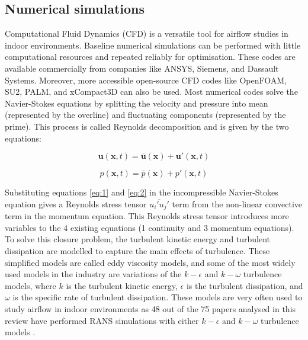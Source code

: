 \documentclass[preprint,12pt]{elsarticle}
\begin{document}
\subsection{Numerical simulations}

Computational Fluid Dynamics (CFD) is a versatile tool for airflow studies in indoor environments. Baseline numerical simulations can be performed with little computational resources and repeated reliably for optimisation. These codes are available commercially from companies like ANSYS, Siemens, and Dassault Systems. Moreover, more accessible open-source CFD codes like OpenFOAM, SU2, PALM, and xCompact3D can also be used. Most numerical codes solve the Navier-Stokes equations by splitting the velocity and pressure into mean (represented by the overline) and fluctuating components (represented by the prime). This process is called Reynolds decomposition and is given by the two equations:

\begin{equation}
    \textbf{u}(\textbf{x},t) = \bar{\textbf{u}}(\textbf{x}) + \textbf{u}'(\textbf{x},t)
\label{eq:1}
\end{equation}

\begin{equation}
    p(\textbf{x},t) = \bar{p}(\textbf{x}) + p'(\textbf{x},t)
\label{eq:2}
\end{equation}

Substituting equations \ref{eq:1} and \ref{eq:2} in the incompressible Navier-Stokes equation gives a Reynolds stress tensor $\overline{u_i'u_j'}$ term from the non-linear convective term in the momentum equation. This Reynolds stress tensor introduces more variables to the 4 existing equations (1 continuity and 3 momentum equations). To solve this closure problem, the turbulent kinetic energy and turbulent dissipation are modelled to capture the main effects of turbulence. These simplified models are called eddy viscosity models, and some of the most widely used models in the industry are variations of the $k-\epsilon$ and $k-\omega$ turbulence models, where $k$ is the turbulent kinetic energy, $\epsilon$ is the turbulent dissipation, and $\omega$ is the specific rate of turbulent dissipation. These models are very often used to study airflow in indoor environments as  48 out of the 75 papers analysed in this review have performed RANS simulations with either $k-\epsilon$ \cite{li2020investigating,liu2020experimental,aliyu2021dispersion} and $k-\omega$ turbulence models \cite{lordly2022understanding,xu2023cfd,cortellessa2023effectiveness,arpino2023cfd}.
\end{document}

